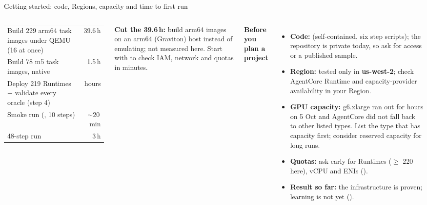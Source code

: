 \begin{frame}{Getting started: code, Regions, capacity and time to first run}
\begin{columns}[T]
\tiny\setlength{\tabcolsep}{3pt}
\begin{tabularx}{\linewidth}{@{}Yr@{}}
\toprule
Build 229 arm64 task images under QEMU (16 at once) & 39.6\,h\\
Build 78 m5 task images, native & 1.5\,h\\
Deploy 219 Runtimes + validate every oracle (step 4) & hours\\
Smoke run (, 10 steps) & $\sim$20\,min\\
48-step run & 3\,h\\
\bottomrule
\end{tabularx}
\par\vspace{1mm}
{\tiny\textbf{Cut the 39.6\,h:} build arm64 images on an arm64 (Graviton) host instead of emulating; not measured here. Start with  to check IAM, network and quotas in minutes.\par}
\textbf{\footnotesize Before you plan a project}
\begin{itemize}\tiny\setlength{\itemsep}{0.6mm}
\item \textbf{Code:}  (self-contained, six step scripts); the repository is private today, so ask for access or a published sample.
\item \textbf{Region:} tested only in \textbf{us-west-2}; check AgentCore Runtime and capacity-provider availability in your Region.
\item \textbf{GPU capacity:} g6.xlarge ran out for hours on 5 Oct and AgentCore did not fall back to other listed types. List the type that has capacity first; consider reserved capacity for long runs.
\item \textbf{Quotas:} ask early for Runtimes ($\ge$ 220 here), vCPU and ENIs ().
\item \textbf{Result so far:} the infrastructure is proven; learning is not yet ().
\end{itemize}
\end{columns}
\end{frame}

